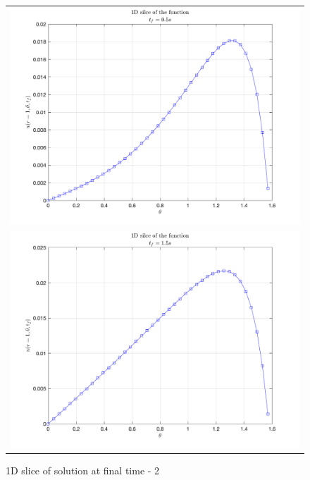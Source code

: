 \documentclass[11pt]{article}
\begin{document}
\begin{enumerate}
\begin{enumerate}
\begin{figure}[htp]
\begin{tabular}{c}
            \includegraphics[width=5in]{Q2D_3.png}\\
            \includegraphics[width=5in]{Q2D_4.png}
        \end{tabular}
        \caption{1D slice of solution at final time - 2}
        \label{fig:slice1D_2}
    \end{figure}    
  \end{enumerate}
\end{enumerate}
\end{document}
